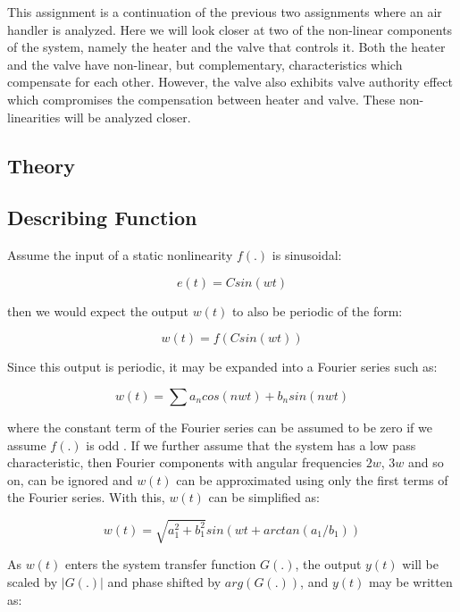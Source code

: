 \documentclass[a4paper, titlepage]{article}
\begin{document}
This assignment is a continuation of the previous two assignments where an air handler is analyzed.
Here we will look closer at two of the non-linear components of the system, namely the heater and the valve that controls it.
Both the heater and the valve have non-linear, but complementary, characteristics which compensate for each other.  However, the valve also exhibits valve authority effect which compromises the compensation between heater and valve.  These non-linearities will be analyzed closer. 
\citep[p.123]{glad00}

\subsection{Theory}

\subsection{Describing Function}
Assume the input of a static nonlinearity $f(.)$ is sinusoidal:

\begin{equation}
	e(t) = Csin(wt)
	\label{equ:input_e}
\end{equation}

then we would expect the output $w(t)$ to also be periodic of the form:

\begin{equation}
	w(t) = f(Csin(wt))
\end{equation}

Since this output is periodic, it may be expanded into a Fourier series such as:

\begin{equation}
	w(t) = \sum{a_{n}cos(nwt)+b_{n}sin(nwt)}
\end{equation}

where the constant term of the Fourier series can be assumed to be zero if we assume $f(.)$ is odd \citep[p. 358]{glad00}.  If we further assume that the system has a low pass characteristic, then Fourier components with angular frequencies $2w$, $3w$ and so on, can be ignored and $w(t)$ can be approximated using only the first terms of the Fourier series.  With this, $w(t)$ can be simplified as:

\begin{equation}
	w(t) = \sqrt{a_{1}^2+b_{1}^2}sin(wt+arctan(a_{1}/b_{1}))
\end{equation}

As $w(t)$ enters the system transfer function $G(.)$, the output $y(t)$ will be scaled by $|G(.)|$ and phase shifted by $arg(G(.))$, and $y(t)$ may be written as:
\end{document}
